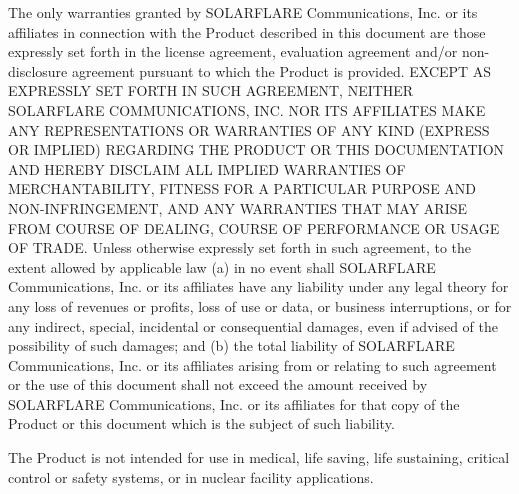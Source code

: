 The only warranties granted by SOLARFLARE Communications, Inc. or its 
affiliates in connection with the Product described in this document are 
those expressly set forth in the license agreement, evaluation agreement 
and/or non-disclosure agreement pursuant to which the Product is provided. 
EXCEPT AS EXPRESSLY SET FORTH IN SUCH AGREEMENT, NEITHER SOLARFLARE 
COMMUNICATIONS, INC. NOR ITS AFFILIATES MAKE ANY REPRESENTATIONS OR 
WARRANTIES OF ANY KIND (EXPRESS OR IMPLIED) REGARDING THE PRODUCT OR THIS 
DOCUMENTATION AND HEREBY DISCLAIM ALL IMPLIED WARRANTIES OF 
MERCHANTABILITY, FITNESS FOR A PARTICULAR PURPOSE AND NON-INFRINGEMENT, 
AND ANY WARRANTIES THAT MAY ARISE FROM COURSE OF DEALING, COURSE OF 
PERFORMANCE OR USAGE OF TRADE. Unless otherwise expressly set forth in 
such agreement, to the extent allowed by applicable law (a) in no event 
shall SOLARFLARE Communications, Inc. or its affiliates have any liability 
under any legal theory for any loss of revenues or profits, loss of use or 
data, or business interruptions, or for any indirect, special, incidental 
or consequential damages, even if advised of the possibility of such 
damages; and (b) the total liability of SOLARFLARE Communications, Inc. or 
its affiliates arising from or relating to such agreement or the use of 
this document shall not exceed the amount received by SOLARFLARE 
Communications, Inc. or its affiliates for that copy of the Product or 
this document which is the subject of such liability.

The Product is not intended for use in medical, life saving, life 
sustaining, critical control or safety systems, or in nuclear facility 
applications.